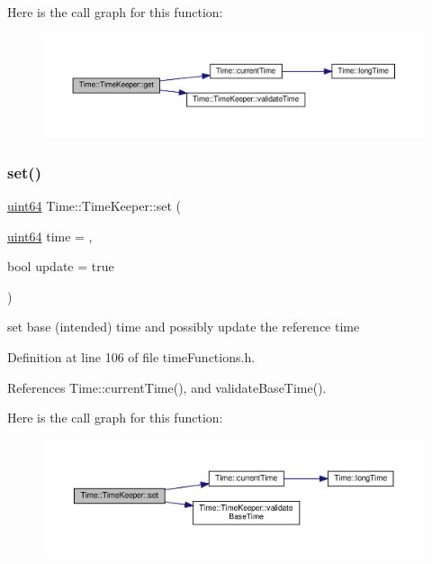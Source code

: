 Here is the call graph for this function\+:
\nopagebreak
\begin{figure}[H]
\begin{center}
\leavevmode
\includegraphics[width=350pt]{classTime_1_1TimeKeeper_a1cb3ff75c82149d1d8fc19bd91d0dec7_cgraph}
\end{center}
\end{figure}
\mbox{\label{classTime_1_1TimeKeeper_a3495ee4c92a5c4540a6a223c0cc6eeed}} 
\subsubsection{\texorpdfstring{set()}{set()}}
{\footnotesize\ttfamily \hyperlink{systemDefines_8h_abc0f5bc07737e498f287334775dff2b6}{uint64} Time\+::\+Time\+Keeper\+::set (\begin{DoxyParamCaption}\item[{\hyperlink{systemDefines_8h_abc0f5bc07737e498f287334775dff2b6}{uint64}}]{time = {},  }\item[{bool}]{update = {\ttfamily true} }\end{DoxyParamCaption})\hspace{0.3cm}{\ttfamily [inline]}}

set base (intended) time and possibly update the reference time 

Definition at line 106 of file time\+Functions.\+h.



References Time\+::current\+Time(), and validate\+Base\+Time().

Here is the call graph for this function\+:
\nopagebreak
\begin{figure}[H]
\begin{center}
\leavevmode
\includegraphics[width=350pt]{classTime_1_1TimeKeeper_a3495ee4c92a5c4540a6a223c0cc6eeed_cgraph}
\end{center}
\end{figure}
\mbox{\label{classTime_1_1TimeKeeper_a033210ff55b364ea2cb409506b988bc2}} 
